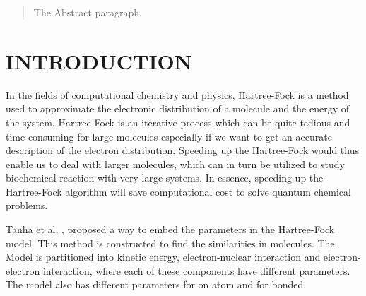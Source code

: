 \documentclass[twoside]{article}
\begin{document}
%

%


\begin{abstract}
  The Abstract paragraph.
\end{abstract}

\section{INTRODUCTION}
In the fields of computational chemistry and physics, Hartree-Fock is a method used to approximate the electronic distribution of a molecule and the energy of the system. Hartree-Fock is an iterative process which can be quite tedious and time-consuming for large molecules especially if we want to get an accurate description of the electron distribution. Speeding up the Hartree-Fock would thus enable us to deal with larger molecules, which can in turn be utilized to study biochemical reaction with very large systems. In essence, speeding up the Hartree-Fock algorithm will save computational cost to solve quantum chemical problems. 



Tanha et al, \cite{Matteus}, proposed a way to embed the parameters in the Hartree-Fock model. This method is constructed to find the similarities in molecules. The Model is partitioned into kinetic energy, electron-nuclear interaction and electron-electron interaction, where each of these components have different parameters. The model also has different parameters for on atom and for bonded.
\end{document}
